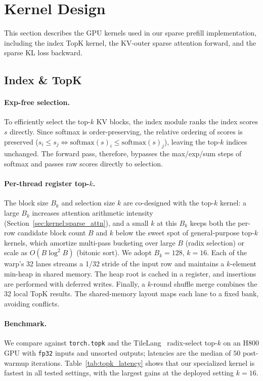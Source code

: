\section{Kernel Design}
\label{sec:infrastructure}

This section describes the GPU kernels used in our sparse prefill implementation, including the index TopK kernel, the KV-outer sparse attention forward, and the sparse KL loss backward.

\subsection{Index \& TopK}

\paragraph{Exp-free selection.}
To efficiently select the top-$k$ KV blocks, the index module ranks the index scores $s$ directly. Since softmax is order-preserving, the relative ordering of scores is preserved ($s_i \le s_j \iff \mathrm{softmax}(s)_i \le \mathrm{softmax}(s)_j$), leaving the top-$k$ indices unchanged. The forward pass, therefore, bypasses the max/exp/sum steps of softmax and passes raw scores directly to selection.

\paragraph{Per-thread register top-$k$.}
The block size $B_k$ and selection size $k$ are co-designed with the top-$k$ kernel: a large $B_k$ increases attention arithmetic intensity (Section~\ref{sec:kernel:sparse_attn}), and a small $k$ at this $B_k$ keeps both the per-row candidate block count $B$ and $k$ below the sweet spot of general-purpose top-$k$ kernels, which amortize multi-pass bucketing over large $B$ (radix selection) or scale as $O(B \log^2 B)$ (bitonic sort). We adopt $B_k = 128$, $k = 16$. Each of the warp's 32 lanes streams a 1/32 stride of the input row and maintains a $k$-element min-heap in shared memory. The heap root is cached in a register, and insertions are performed with deferred writes. Finally, a $k$-round shuffle merge combines the 32 local TopK results. The shared-memory layout maps each lane to a fixed bank, avoiding conflicts.

\paragraph{Benchmark.}
We compare against \texttt{torch.topk} and the TileLang~\citep{wang2025tilelangcomposabletiledprogramming} radix-select top-$k$ on an H800 GPU with \texttt{fp32} inputs and unsorted outputs; latencies are the median of $50$ post-warmup iterations. Table~\ref{tab:topk_latency} shows that our specialized kernel is fastest in all tested settings, with the largest gains at the deployed setting $k = 16$.

